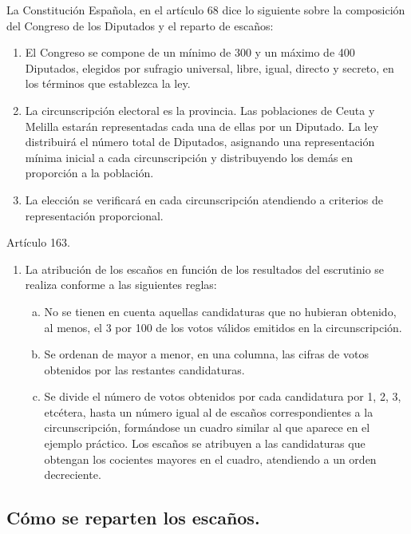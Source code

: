 \documentclass[11pt]{article}
\begin{document}
	La Constitución Española, en el artículo 68 dice lo siguiente sobre la composición del Congreso de los Diputados y el reparto de escaños:
	
	\begin{enumerate}
		\item El Congreso se compone de un mínimo de 300 y un máximo de 400 Diputados, elegidos por sufragio universal, libre, igual, directo y secreto, en los términos que establezca la ley.
		\item La circunscripción electoral es la provincia. Las poblaciones de Ceuta y Melilla estarán representadas cada una de ellas por un Diputado. La ley distribuirá el número total de Diputados, asignando una representación mínima inicial a cada circunscripción y distribuyendo los demás en proporción a la población.
		\item La elección se verificará en cada circunscripción atendiendo a criterios de representación proporcional. \\
	\end{enumerate}
	
	
		
	Artículo 163.
	
	\begin{enumerate}
		\item La atribución de los escaños en función de los resultados del escrutinio se realiza conforme a las siguientes reglas:
		\begin{enumerate}[a)]
				\item No se tienen en cuenta aquellas candidaturas que no hubieran obtenido, al menos, el 3 por 100 de los votos válidos emitidos en la circunscripción.
				\item Se ordenan de mayor a menor, en una columna, las cifras de votos obtenidos por las restantes candidaturas.
				\item Se divide el número de votos obtenidos por cada candidatura por 1, 2, 3, etcétera, hasta un número igual al de escaños correspondientes a la circunscripción, formándose un cuadro similar al que aparece en el ejemplo práctico. Los escaños se atribuyen a las candidaturas que obtengan los cocientes mayores en el cuadro, atendiendo a un orden decreciente.
			\end{enumerate}
	\end{enumerate}
	
	\subsection{Cómo se reparten los escaños.}
\end{document}
